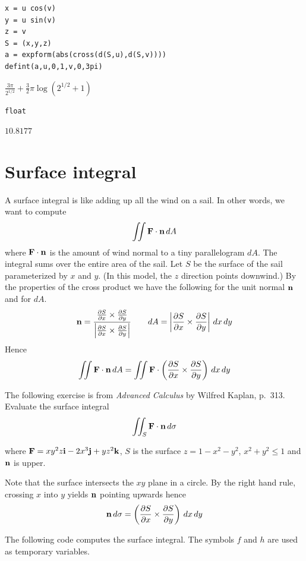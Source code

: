 \documentclass[12pt]{article}
\begin{document}
{\color{blue}
\begin{verbatim}
x = u cos(v)
y = u sin(v)
z = v
S = (x,y,z)
a = expform(abs(cross(d(S,u),d(S,v))))
defint(a,u,0,1,v,0,3pi)
\end{verbatim}
}

$\displaystyle \frac{3\pi}{2^{1/2}}+\tfrac{3}{2}\pi\log\left(2^{1/2}+1\right)$

{\color{blue}
\begin{verbatim}
float
\end{verbatim}
}

$\displaystyle 10.8177$

\newpage

\section{Surface integral}

A surface integral is like adding up all the wind on a sail.
In other words, we want to compute
$$\int\!\!\!\int{\bf F\cdot n}\,dA$$
where ${\bf F\cdot n}$ is the amount of wind normal to a tiny parallelogram $dA$.
The integral sums over the entire area of the sail.
Let $S$ be the surface of the sail parameterized by $x$ and $y$.
(In this model, the $z$ direction points downwind.)
By the properties of the cross product we have the following for the unit normal $\bf n$
and for $dA$.
$${\bf n}=\frac{{\frac{\partial S}{\partial x}\times\frac{\partial S}{\partial y}}}
{{\left|\frac{\partial S}{\partial x}\times\frac{\partial S}{\partial y}\right|}}\qquad
dA=\left|\frac{\partial S}{\partial x}\times\frac{\partial S}{\partial y}\right|\,dx\,dy$$
Hence
$$\int\!\!\!\int{\bf F\cdot n}\,dA=\int\!\!\!\int{\bf F}\cdot
\left({\frac{\partial S}{\partial x}\times\frac{\partial S}{\partial y}}\right)\,dx\,dy$$

\bigskip
The following exercise is from
{\it Advanced Calculus} by Wilfred Kaplan, p.~313.
Evaluate the surface integral
$$\int\!\!\!\int_S{\bf F\cdot n}\,d\sigma$$

where ${\bf F}=xy^2z{\bf i}-2x^3{\bf j}+yz^2{\bf k}$, $S$ is the surface
$z=1-x^2-y^2$, $x^2+y^2\le1$ and $\bf n$ is upper.

\bigskip
Note that the surface intersects the $xy$ plane in a circle.
By the right hand rule, crossing $x$ into $y$ yields $\bf n$ pointing upwards hence
$${\bf n}\,d\sigma=\left({\frac{\partial S}{\partial x}\times\frac{\partial S}{\partial y}}\right)\,dx\,dy$$

The following code computes the surface integral.
The symbols $f$ and $h$ are used as temporary variables.
\end{document}
